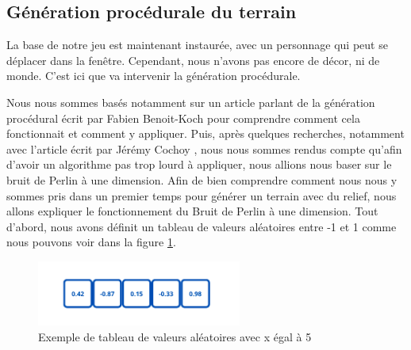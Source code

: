 \documentclass[12pt]{article}
\begin{document}
\subsection{Génération procédurale du terrain}

La base de notre jeu est maintenant instaurée, avec un personnage qui peut se déplacer dans la fenêtre. Cependant, nous n'avons pas encore de décor, ni de monde. C'est ici que va intervenir la génération procédurale.\par
Nous nous sommes basés notamment sur un article parlant de la génération procédural écrit par Fabien Benoit-Koch \cite{benoitkoch} pour comprendre comment cela fonctionnait et comment y appliquer.
Puis, après quelques recherches, notamment avec l'article écrit par Jérémy Cochoy \cite{cochoy2011perlin}, nous nous sommes rendus compte qu'afin d'avoir un algorithme pas trop lourd à appliquer, nous allions nous baser sur le bruit de Perlin à une dimension. 
Afin de bien comprendre comment nous nous y sommes pris dans un premier temps pour générer un terrain avec du relief, nous allons expliquer le fonctionnement du Bruit de Perlin à une dimension. Tout d'abord, nous avons définit un tableau de valeurs aléatoires entre -1 et 1 comme nous pouvons voir dans la figure \ref{tableau}.\par

\begin{figure}[!h]
  \centering
  \includegraphics[width=0.6\textwidth]{assets/tableau.png}
  \caption{Exemple de tableau de valeurs aléatoires avec x égal à 5}
  \label{tableau}
\end{figure}
\end{document}
